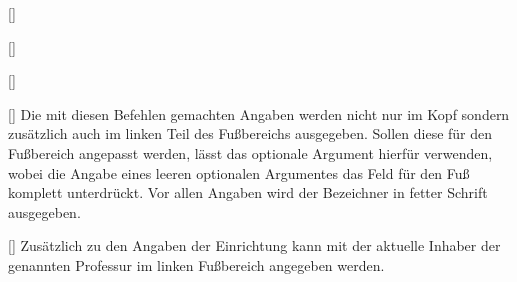 \begin{Bundle*}[v2.05]{}
\begin{Declaration}{%
  []%
}
\begin{Declaration}{%
  []%
}
\begin{Declaration}{%
  []%
}
\begin{Declaration}{%
  []%
}
\printdeclarationlist%
%
Die mit diesen Befehlen gemachten Angaben werden nicht nur im Kopf sondern 
zusätzlich auch im linken Teil des Fußbereichs ausgegeben. Sollen diese für den 
Fußbereich angepasst werden, lässt das optionale Argument hierfür verwenden, 
wobei die Angabe eines leeren optionalen Argumentes das Feld für den Fuß 
komplett unterdrückt. Vor allen Angaben wird der Bezeichner  
in fetter Schrift ausgegeben.
\end{Declaration}
\end{Declaration}
\end{Declaration}
\end{Declaration}


\begin{Declaration}{[]}
\printdeclarationlist%
%
Zusätzlich zu den Angaben der Einrichtung kann mit  der 
aktuelle Inhaber der genannten Professur im linken Fußbereich angegeben werden.
\end{Declaration}


\end{Bundle*}
